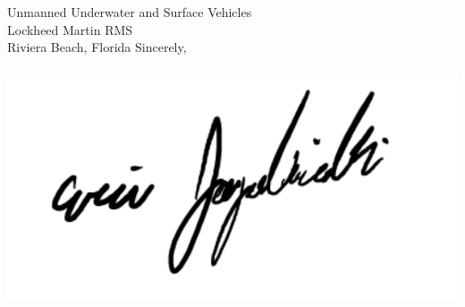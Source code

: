 \documentclass[11pt]{letter} %
\begin{document}
\begin{letter}{Unmanned Underwater and Surface Vehicles \\
Lockheed Martin RMS \\
Riviera Beach, Florida
}
Sincerely,\\ \\
\includegraphics[width=0.3\linewidth]{signature.pdf}

 



\end{letter}
\end{document}
